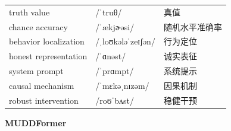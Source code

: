 \documentclass[UTF8,12pt,a4paper]{ctexart}
\providecommand{\zh}[1]{#1}
\begin{document}
\begin{tabular*}{\textwidth}{@{\extracolsep{\fill}}lll@{}}
truth value & {\ipafont /ˈtruθ/} & \zh{真值} \\
chance accuracy & {\ipafont /ˈækjɚəsi/} & \zh{随机水平准确率} \\
behavior localization & {\ipafont /ˌloʊkələˈzeɪʃən/} & \zh{行为定位} \\
honest representation & {\ipafont /ˈɑnəst/} & \zh{诚实表征} \\
system prompt & {\ipafont /ˈprɑmpt/} & \zh{系统提示} \\
causal mechanism & {\ipafont /ˈmɛkəˌnɪzəm/} & \zh{因果机制} \\
robust intervention & {\ipafont /roʊˈbʌst/} & \zh{稳健干预} \\
\bottomrule
\end{tabular*}

\newpage

\begin{center}
    {\Large\bfseries MUDDFormer}
\end{center}
\end{document}
